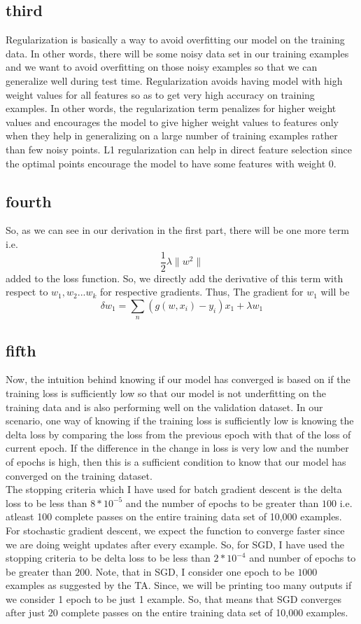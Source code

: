 \documentclass[11pt]{article}
\begin{document}
\subsection{third}
Regularization is basically a way to avoid overfitting our model on the training data. In other words, there will be some noisy data set in our training examples and we want to avoid overfitting on those noisy examples so that we can generalize well during test time. Regularization avoids having model with high weight values for all features so as to get very high accuracy on training examples. In other words, the regularization term penalizes for higher weight values and encourages the model to give higher weight values to features only when they help in generalizing on a large number of training examples rather than few noisy points. L1 regularization can help in direct feature selection since the optimal points encourage the model to have some features with weight 0.

\subsection{fourth}
So, as we can see in our derivation in the first part, there will be one more term i.e. $$\frac {1}{2} \lambda \| w^{2} \| $$ added to the loss function. So, we directly add the derivative of this term with respect to $w_1,w_2...w_k$ for respective gradients. Thus, The gradient for $w_1$ will be
$$\delta w_1 = \sum_{n} (g(w,x_i)-y_i)x_1 + \lambda w_1$$

\subsection{fifth}
Now, the intuition behind knowing if our model has converged is based on if the training loss is sufficiently low so that our model is not underfitting on the training data and is also performing well on the validation dataset. In our scenario, one way of knowing if the training loss is sufficiently low is knowing the delta loss by comparing the loss from the previous epoch with that of the loss of current epoch. If the difference in the change in loss is very low and the number of epochs is high, then this is a sufficient condition to know that our model has converged on the training dataset.\\
The stopping criteria which I have used for batch gradient descent is the delta loss to be less than $8 * 10^{-5}$ and the number of epochs to be greater than $100$ i.e. atleast 100 complete passes on the entire training data set of 10,000 examples.\\
For stochastic gradient descent, we expect the function to converge faster since we are doing weight updates after every example. So, for SGD, I have used the stopping criteria to be delta loss to be less than $2*10^{-4}$ and number of epochs to be greater than $200$. Note, that in SGD, I consider one epoch to be $1000$ examples as suggested by the TA. Since, we will be printing too many outputs if we consider 1 epoch to be just 1 example. So, that means that SGD converges after just $20$ complete passes on the entire training data set of 10,000 examples.
\end{document}
